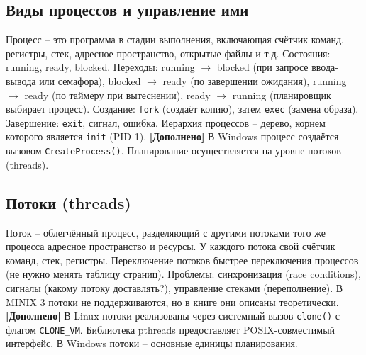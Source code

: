 \documentclass[a4paper,12pt]{article}
\begin{document}
\subsection{Виды процессов и управление ими}
Процесс – это программа в стадии выполнения, включающая счётчик команд, регистры, стек, адресное пространство, открытые файлы и т.д. Состояния: running, ready, blocked. Переходы: running $\to$ blocked (при запросе ввода-вывода или семафора), blocked $\to$ ready (по завершении ожидания), running $\to$ ready (по таймеру при вытеснении), ready $\to$ running (планировщик выбирает процесс). Создание: \texttt{fork} (создаёт копию), затем \texttt{exec} (замена образа). Завершение: \texttt{exit}, сигнал, ошибка. Иерархия процессов – дерево, корнем которого является \texttt{init} (PID 1).
\textbf{[Дополнено]} В Windows процесс создаётся вызовом \texttt{CreateProcess()}. Планирование осуществляется на уровне потоков (threads).

\subsection{Потоки (threads)}
Поток – облегчённый процесс, разделяющий с другими потоками того же процесса адресное пространство и ресурсы. У каждого потока свой счётчик команд, стек, регистры. Переключение потоков быстрее переключения процессов (не нужно менять таблицу страниц). Проблемы: синхронизация (race conditions), сигналы (какому потоку доставлять?), управление стеками (переполнение). В MINIX 3 потоки не поддерживаются, но в книге они описаны теоретически.
\textbf{[Дополнено]} В Linux потоки реализованы через системный вызов \texttt{clone()} с флагом \texttt{CLONE\_VM}. Библиотека pthreads предоставляет POSIX-совместимый интерфейс. В Windows потоки – основные единицы планирования.
\end{document}
